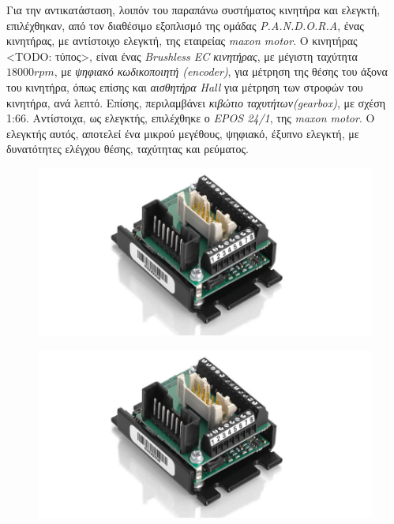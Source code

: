 \bigskip
Για την αντικατάσταση, λοιπόν του παραπάνω συστήματος κινητήρα και ελεγκτή, επιλέχθηκαν, από τον διαθέσιμο εξοπλισμό της ομάδας \textit{P.A.N.D.O.R.A}, ένας κινητήρας, με αντίστοιχο ελεγκτή, της εταιρείας \textit{maxon motor}. Ο κινητήρας <TODO: τύπος>, είναι ένας \textit{Brushless EC κινητήρας}, με μέγιστη ταχύτητα $18000rpm$, με \textit{ψηφιακό κωδικοποιητή (encoder)}, για μέτρηση της θέσης του άξονα του κινητήρα, όπως επίσης και \textit{αισθητήρα Hall} για μέτρηση των στροφών του κινητήρα, ανά λεπτό. Επίσης, περιλαμβάνει \textit{κιβώτιο ταχυτήτων(gearbox)}, με σχέση 1:66. Αντίστοιχα, ως ελεγκτής, επιλέχθηκε ο \textit{EPOS 24/1}, της \textit{maxon motor}. Ο ελεγκτής αυτός, αποτελεί ένα μικρού μεγέθους, ψηφιακό, έξυπνο ελεγκτή, με δυνατότητες ελέγχου 
θέσης, ταχύτητας και ρεύματος.

\begin{figure}[!ht]
	\begin{minipage}{.49\textwidth}		
		\centering
		\includegraphics[width=0.8\linewidth]{Chapters/Chapter2/Figures/maxon_motor.jpg}
		\label{fig:maxon_motor}
	\end{minipage}
	\begin{minipage}{.5\textwidth}
 	\centering
		\includegraphics[width=0.8\linewidth]{Chapters/Chapter2/Figures/epos241.jpg}
		\label{fig:epos241}
	\end{minipage}
\end{figure}

